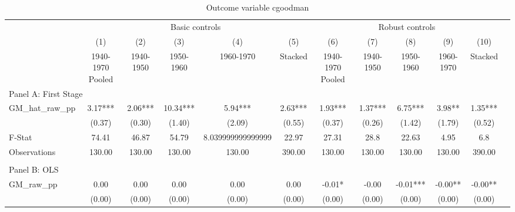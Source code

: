  \begin{table}[htbp]\centering {} \begin{threeparttable} \caption{Outcome variable cgoodman } \begin{tabular}{l*{11}{c}} \toprule
          &\multicolumn{5}{c}{Basic controls}                                   &\multicolumn{5}{c}{Robust controls}                                  \\\cmidrule(lr){2-6}\cmidrule(lr){7-11}
          &\multicolumn{1}{c}{(1)}&\multicolumn{1}{c}{(2)}&\multicolumn{1}{c}{(3)}&\multicolumn{1}{c}{(4)}&\multicolumn{1}{c}{(5)}&\multicolumn{1}{c}{(6)}&\multicolumn{1}{c}{(7)}&\multicolumn{1}{c}{(8)}&\multicolumn{1}{c}{(9)}&\multicolumn{1}{c}{(10)}\\
          &\multicolumn{1}{c}{1940-1970 Pooled}&\multicolumn{1}{c}{1940-1950}&\multicolumn{1}{c}{1950-1960}&\multicolumn{1}{c}{1960-1970}&\multicolumn{1}{c}{Stacked}&\multicolumn{1}{c}{1940-1970 Pooled}&\multicolumn{1}{c}{1940-1950}&\multicolumn{1}{c}{1950-1960}&\multicolumn{1}{c}{1960-1970}&\multicolumn{1}{c}{Stacked}\\
\cmidrule(lr){1-11}
\multicolumn{10}{l}{Panel A: First Stage}\\
\cmidrule(lr){1-11}
GM\_hat\_raw\_pp&      3.17***&      2.06***&     10.34***&      5.94***&      2.63***&      1.93***&      1.37***&      6.75***&      3.98** &      1.35***\\
          &    (0.37)   &    (0.30)   &    (1.40)   &    (2.09)   &    (0.55)   &    (0.37)   &    (0.26)   &    (1.42)   &    (1.79)   &    (0.52)   \\
\midrule
F-Stat    &     74.41   &     46.87   &     54.79   &8.039999999999999   &     22.97   &     27.31   &      28.8   &     22.63   &      4.95   &       6.8   \\
Observations&    130.00   &    130.00   &    130.00   &    130.00   &    390.00   &    130.00   &    130.00   &    130.00   &    130.00   &    390.00   \\
\cmidrule[\heavyrulewidth](lr){1-11} \\ \cmidrule[\heavyrulewidth](lr){1-11}
\multicolumn{10}{l}{Panel B: OLS}\\
\cmidrule(lr){1-11}
GM\_raw\_pp &      0.00   &      0.00   &      0.00   &      0.00   &      0.00   &     -0.01*  &     -0.00   &     -0.01***&     -0.00** &     -0.00** \\
          &    (0.00)   &    (0.00)   &    (0.00)   &    (0.00)   &    (0.00)   &    (0.00)   &    (0.00)   &    (0.00)   &    (0.00)   &    (0.00)   \\

\end{tabular}
\end{threeparttable}
\end{table}
